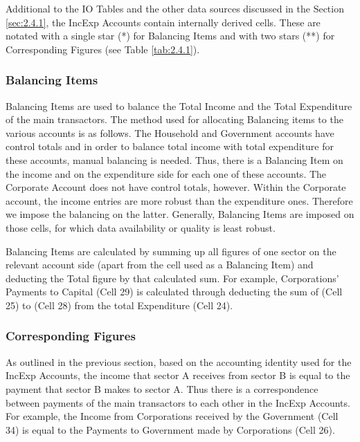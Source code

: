 \bigskip

Additional to the IO Tables and the other data sources discussed in the Section \ref{sec:2.4.1}, the IncExp Accounts contain internally derived cells. These are notated with a single star (*) for Balancing Items and with two stars (**) for Corresponding Figures (see Table \ref{tab:2.4.1}).

\bigskip

\subsubsection{Balancing Items}

Balancing Items are used to balance the Total Income and the Total Expenditure of the main transactors. The method used for allocating Balancing items to the various accounts is as follows. The Household and Government accounts have control totals and in order to balance total income with total expenditure for these accounts, manual balancing is needed. Thus, there is a Balancing Item on the income and on the expenditure side for each one of these accounts. The Corporate Account does not have control totals, however. Within the Corporate account, the income entries are more robust than the expenditure ones. Therefore we impose the balancing on the latter. Generally, Balancing Items are imposed on those cells, for which data availability or quality is least robust.

\bigskip

Balancing Items are calculated by summing up all figures of one sector on the relevant account side (apart from the cell used as a Balancing Item) and deducting the Total figure by that calculated sum. For example, Corporations' Payments to Capital (Cell 29) is calculated through deducting the sum of (Cell 25) to (Cell 28) from the total Expenditure (Cell 24).

\bigskip

\subsubsection{Corresponding Figures}

As outlined in the previous section, based on the accounting identity used for the IncExp Accounts, the income that sector A receives from sector B is equal to the payment that sector B makes to sector A. Thus there is a correspondence between payments of the main transactors to each other in the IncExp Accounts. For example, the Income from Corporations received by the Government (Cell 34) is equal to the Payments to Government made by Corporations (Cell 26).

